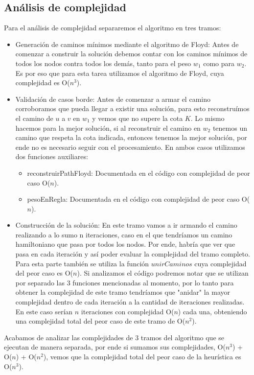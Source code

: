\newpage
\subsection{An\'alisis de complejidad}
Para el an\'alisis de complejidad separaremos el algoritmo en tres tramos:
\begin{itemize}
\item Generaci\'on de caminos m\'inimos mediante el algoritmo de Floyd:
	Antes de comenzar a construir la soluci\'on debemos contar con los caminos m\'inimos de todos los nodos contra todos los dem\'as, tanto para el peso $w_1$ como para $w_2$. Es por eso que para esta tarea utilizamos el algoritmo de Floyd, cuya complejidad es O($n^3$). 
\item Validaci\'on de casos borde:
	Antes de comenzar a armar el camino corroboramos que pueda llegar a existir una soluci\'on, para esto reconstru\'imos el camino de $u$ a $v$ en $w_1$ y vemos que no supere la cota $K$. 
	Lo mismo hacemos para la mejor soluci\'on, si al reconstruir el camino en $w_2$ tenemos un camino que respeta la cota indicada, entonces tenemos la mejor soluci\'on, por ende no es necesario seguir con el procesamiento.
	En ambos casos utilizamos dos funciones auxiliares:
	\begin{itemize}
	\item reconstruirPathFloyd: Documentada en el c\'odigo con complejidad de peor caso O($n$).
	\item pesoEnRegla: Documentada en el c\'odigo con complejidad de peor caso O($n$).
	\end{itemize}
\item Construcci\'on de la soluci\'on:
	En este tramo vamos a ir armando el camino realizando a lo sumo n iteraciones, caso en el que tendr\'iamos un camino hamiltoniano que pasa por todos los nodos. Por ende, habr\'ia que ver que pasa en cada iteraci\'on y as\'i poder evaluar la complejidad del tramo completo.
	Para esta parte tambi\'en se utiliza la funci\'on $unirCaminos$ cuya complejidad del peor caso es O($n$).
	Si analizamos el c\'odigo podremos notar que se utilizan por separado las 3 funciones mencionadas al momento, por lo tanto para obtener la complejidad de este tramo tendr\'iamos que "anidar" la mayor complejidad dentro de cada iteraci\'on a la cantidad de iteraciones realizadas. En este caso ser\'ian $n$ iteraciones con complejidad O($n$) cada una, obteniendo una complejidad total del peor caso de este tramo de O($n^2$).
\end{itemize}

Acabamos de analizar las complejidades de 3 tramos del algoritmo que se ejecutan de manera separada, por ende si sumamos sus complejidades, O($n^3$) + O($n$) + O($n^2$), vemos que la complejidad total del peor caso de la heur\'istica es O($n^3$).


